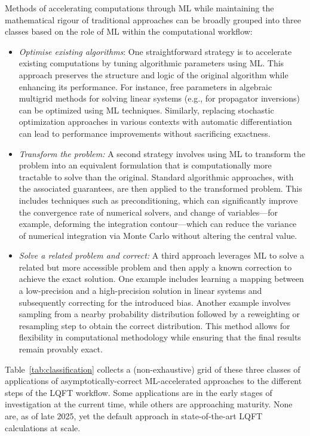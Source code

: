 \documentclass[12pt]{article}
\begin{document}
Methods of accelerating computations through ML while maintaining the mathematical rigour of traditional approaches can be broadly grouped into three classes based on the role of ML within the computational workflow:
\begin{itemize}
    \item {\it Optimise existing algorithms}: One straightforward strategy is to accelerate existing computations by tuning algorithmic parameters using ML. This approach preserves the structure and logic of the original algorithm while enhancing its performance. For instance, free parameters in algebraic multigrid methods for solving linear systems (e.g., for propagator inversions) can be optimized using ML techniques. Similarly, replacing stochastic optimization approaches in various contexts with automatic differentiation can lead to performance improvements without sacrificing exactness. 
    \item {\it Transform the problem:} A second strategy involves using ML to transform the problem into an equivalent formulation that is computationally more tractable to solve than the original. Standard algorithmic approaches, with the associated guarantees, are then applied to the transformed problem. This includes techniques such as preconditioning, which can significantly improve the convergence rate of numerical solvers, and change of variables—for example, deforming the integration contour—which can reduce the variance of numerical integration via Monte Carlo without altering the central value. 
    \item {\it Solve a related problem and correct:} A third approach leverages ML to solve a related but more accessible problem and then apply a known correction to achieve the exact solution. One example includes learning a mapping between a low-precision and a high-precision solution in linear systems and subsequently correcting for the introduced bias. Another example involves sampling from a nearby probability distribution followed by a reweighting or resampling step to obtain the correct distribution. This method allows for flexibility in computational methodology while ensuring that the final results remain provably exact.
\end{itemize}
%
Table~\ref{tab:classification} collects a (non-exhaustive) grid of these three classes of applications of asymptotically-correct ML-accelerated approaches to the different steps of the LQFT workflow. Some applications are in the early stages of investigation at the current time, while others are approaching maturity. None are, as of late 2025, yet the default approach in state-of-the-art LQFT calculations at scale. 
\end{document}
